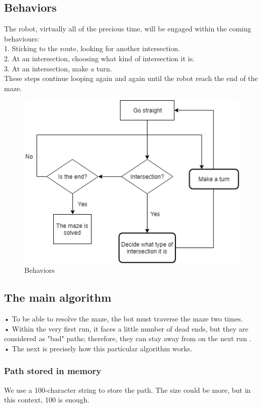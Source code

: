 \documentclass{article}
\begin{document}
\subsection{Behaviors}
The robot, virtually all of the precious time, will be engaged within the coming behaviours:\\
1. Sticking to the route, looking for another intersection.\\
2. At an intersection, choosing what kind of intersection it is.\\
3. At an intersection, make a turn.\\
These steps continue looping again and again until the robot reach the end of the maze.\\
\begin{figure}[h!]
	\centering
	\includegraphics[width=400pt]{pic2.png}
	\caption{Behaviors}
\end{figure}

\subsection{The main algorithm}
• To be able to resolve the maze, the bot must traverse the maze two times.\\
• Within the very first run, it faces a little number of dead ends, but they are considered as "bad" paths; therefore, they can stay away from on the next run \cite{ref2}.\\
• The next is precisely how this particular algorithm works.\\
\subsubsection{Path stored in memory}
We use a 100-character string to store the path. The size could be more, but in this context, 100 is enough.
\end{document}
